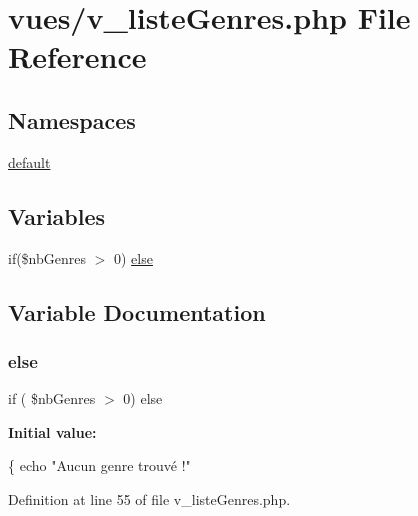 \hypertarget{v__liste_genres_8php}{}\section{vues/v\+\_\+liste\+Genres.php File Reference}
\label{v__liste_genres_8php}
\subsection*{Namespaces}
\begin{DoxyCompactItemize}
\item 
 \hyperlink{namespacedefault}{default}
\end{DoxyCompactItemize}
\subsection*{Variables}
\begin{DoxyCompactItemize}
\item 
if(\$nb\+Genres $>$ 0) \hyperlink{v__liste_genres_8php_af460d2d6b15048cf33414c75cdb45cb0}{else}
\end{DoxyCompactItemize}


\subsection{Variable Documentation}
\mbox{\label{v__liste_genres_8php_af460d2d6b15048cf33414c75cdb45cb0}} 
\subsubsection{\texorpdfstring{else}{else}}
{\footnotesize\ttfamily if ( \$nb\+Genres $>$ 0) else}

{\bfseries Initial value\+:}
\begin{DoxyCode}
\{           
                    echo \textcolor{stringliteral}{"Aucun genre trouvé !"}
\end{DoxyCode}


Definition at line 55 of file v\+\_\+liste\+Genres.\+php.

